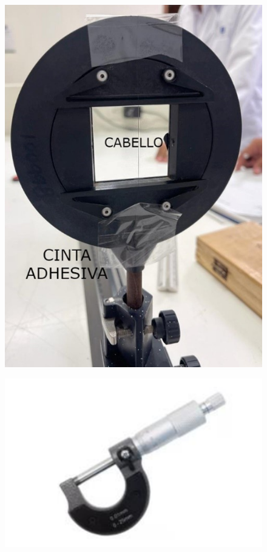 \documentclass[twocolumn, 12pt]{article}
\begin{document}
\begin{figure}[H]
      \begin{center}
            \includegraphics[width=.9\linewidth]{./Images/3.jpg}
            \caption{}
      \end{center}
\end{figure}

\vspace{-.5cm}

\begin{figure}[H]
      \begin{center}
            \includegraphics[width=.9\linewidth]{./Images/4.png}
            \caption{}
      \end{center}
\end{figure}
\end{document}
